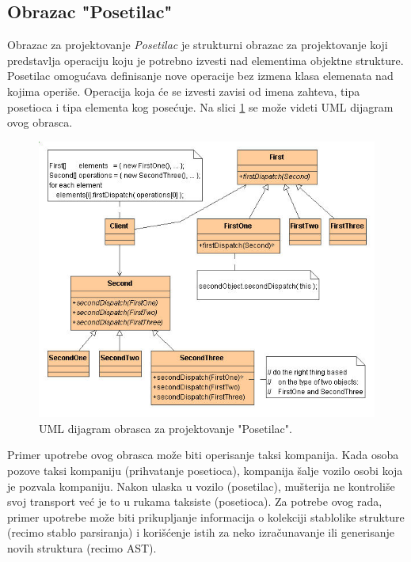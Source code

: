 \subsection{Obrazac "Posetilac"}
\label{subsec:DesignPatternsListener}

Obrazac za projektovanje \emph{Posetilac} je strukturni obrazac za projektovanje koji predstavlja operaciju koju je potrebno izvesti nad elementima objektne strukture. Posetilac omogućava definisanje nove operacije bez izmena klasa elemenata nad kojima operiše. Operacija koja će se izvesti zavisi od imena zahteva, tipa posetioca i tipa elementa kog posećuje. Na slici \ref{fig:UMLVisitor} se može videti UML dijagram \cite{UML} ovog obrasca. 

\begin{figure}[h!]
    \centering
    \includegraphics[scale=0.6]{images/visitor.jpg}
    \caption{UML dijagram obrasca za projektovanje "Posetilac".} 
    \label{fig:UMLVisitor}
\end{figure}

Primer upotrebe ovog obrasca može biti operisanje taksi kompanija. Kada osoba pozove taksi kompaniju (prihvatanje posetioca), kompanija šalje vozilo osobi koja je pozvala kompaniju. Nakon ulaska u vozilo (posetilac), mušterija ne kontroliše svoj transport već je to u rukama taksiste (posetioca). Za potrebe ovog rada, primer upotrebe može biti prikupljanje informacija o kolekciji stablolike strukture (recimo stablo parsiranja) i korišćenje istih za neko izračunavanje ili generisanje novih struktura (recimo AST). 
